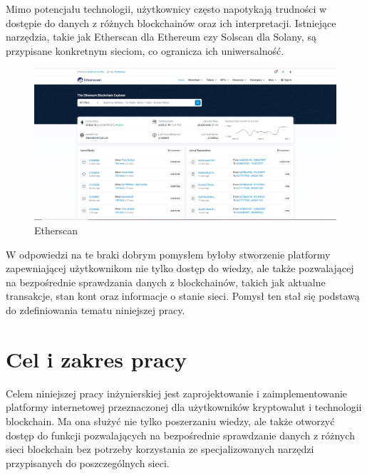 
Mimo potencjału technologii, użytkownicy często napotykają trudności w dostępie do danych z różnych blockchainów oraz ich interpretacji. Istniejące narzędzia, takie jak Etherscan dla Ethereum czy Solscan dla Solany, są przypisane konkretnym sieciom, co ogranicza ich uniwersalność. 
\begin{figure}[htb]
    \centering
    \includegraphics[width=0.8\linewidth]{./obrazy/Etherscan.png}
    \caption{Etherscan}
    \label{fig:Etherscan}
\end{figure}
W odpowiedzi na te braki dobrym pomysłem byłoby stworzenie platformy zapewniającej użytkownikom nie tylko dostęp do wiedzy, ale także pozwalającej na bezpośrednie sprawdzania danych z blockchainów, takich jak aktualne transakcje, stan kont oraz informacje o stanie sieci. Pomysł ten stał się podstawą do zdefiniowania tematu niniejszej pracy.


\section{Cel i zakres pracy}
Celem niniejszej pracy inżynierskiej jest zaprojektowanie i zaimplementowanie platformy internetowej przeznaczonej dla użytkowników kryptowalut i technologii blockchain. Ma ona służyć nie tylko poszerzaniu wiedzy, ale także otworzyć dostęp do funkcji pozwalających na bezpośrednie sprawdzanie danych z różnych sieci blockchain bez potrzeby korzystania ze specjalizowanych narzędzi przypisanych do poszczególnych sieci.

